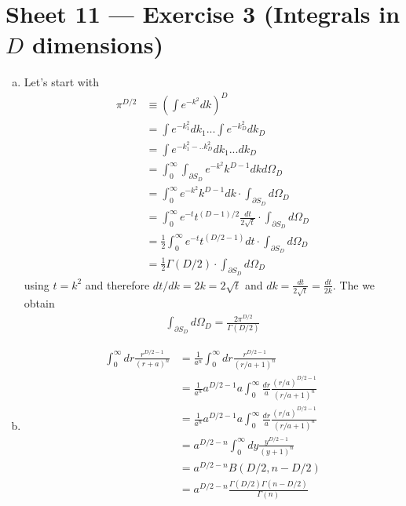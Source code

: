 \documentclass[10pt,a4paper]{report}
\theoremstyle{definition}
\begin{document}
\section{Sheet 11 — Exercise 3 (Integrals in $D$ dimensions)}
\begin{enumerate}[a)]
\item Let's start with 
\begin{align}
\pi^{D/2}
&\equiv\left(\int e^{-k^2}dk\right)^D\\
&=\int e^{-k_1^2}dk_1...\int e^{-k_D^2}dk_D\\
&=\int e^{-k_1^2-..k_D^2}dk_1...dk_D\\
&=\int_0^\infty\int_{\partial S_D} e^{-k^2}k^{D-1}dk d\Omega_D\\
&=\int_0^\infty e^{-k^2}k^{D-1}dk\cdot\int_{\partial S_D} d\Omega_D\\
&=\int_0^\infty e^{-t}t^{(D-1)/2}\frac{dt}{2\sqrt{t}}\cdot\int_{\partial S_D} d\Omega_D\\
&=\frac{1}{2}\int_0^\infty e^{-t}t^{(D/2-1)}dt\cdot\int_{\partial S_D} d\Omega_D\\
&=\frac{1}{2}\Gamma(D/2)\cdot\int_{\partial S_D} d\Omega_D
\end{align}
using $t=k^2$ and therefore $dt/dk=2k=2\sqrt{t}$ and $dk=\frac{dt}{2\sqrt{t}}=\frac{dt}{2k}$.
The we obtain
\begin{align}
\int_{\partial S_D} d\Omega_D=\frac{2\pi^{D/2}}{\Gamma(D/2)}
\end{align}

\item
\begin{align}
\int_0^\infty dr\frac{r^{D/2-1}}{(r+a)^n}
&=\frac{1}{a^n}\int_0^\infty dr\frac{r^{D/2-1}}{(r/a+1)^n}\\
&=\frac{1}{a^n}a^{D/2-1}a\int_0^\infty \frac{dr}{a}\frac{(r/a)^{D/2-1}}{(r/a+1)^n}\\
&=\frac{1}{a^n}a^{D/2-1}a\int_0^\infty \frac{dr}{a}\frac{(r/a)^{D/2-1}}{(r/a+1)^n}\\
&=a^{D/2-n}\int_0^\infty dy \frac{y^{D/2-1}}{(y+1)^n}\\
&=a^{D/2-n}B(D/2,n-D/2)\\
&=a^{D/2-n}\frac{\Gamma(D/2)\Gamma(n-D/2)}{\Gamma(n)}\\
\end{align}

\end{enumerate}
\end{document}
